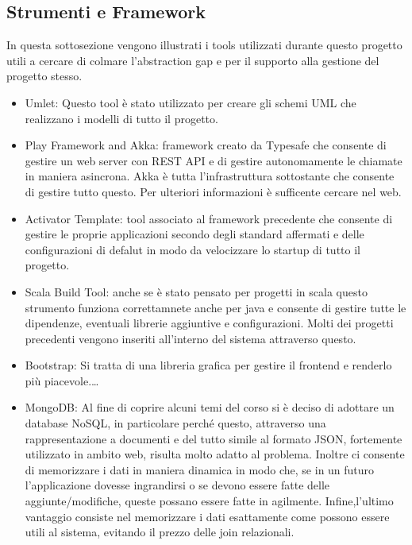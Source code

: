 \subsection{Strumenti e Framework}

In questa sottosezione vengono illustrati i tools utilizzati durante questo progetto utili a cercare di colmare l'abstraction gap e per il supporto alla gestione del progetto stesso.

\begin{itemize}
 \item {Umlet:} Questo tool \`e stato utilizzato per creare gli schemi UML che realizzano i modelli di tutto il progetto.\cite{Umlet}
 \item {Play Framework and Akka:} framework creato da Typesafe che consente di gestire un web server con REST API e di gestire autonomamente le chiamate in maniera asincrona. Akka \`e tutta l'infrastruttura sottostante che consente di gestire tutto questo. Per ulteriori informazioni \`e sufficente cercare nel web.\cite{Akka,PlayFramework}
 \item {Activator Template:} tool associato al framework precedente che consente di gestire le proprie applicazioni secondo degli standard affermati e delle configurazioni di defalut in modo da velocizzare lo startup di tutto il progetto.\cite{Activator&SBT}
 \item {Scala Build Tool:} anche se \`e stato pensato per progetti in scala questo strumento funziona correttamnete anche per java e consente di gestire tutte le dipendenze, eventuali librerie aggiuntive e configurazioni. Molti dei progetti precedenti vengono inseriti all'interno del sistema attraverso questo.\cite{Activator&SBT}
\item {Bootstrap:} Si tratta di una libreria grafica per gestire il frontend e renderlo pi\`u piacevole.\ldots
 \item {MongoDB:} Al fine di coprire alcuni temi del corso si \`e deciso di adottare un database NoSQL, in particolare perch\'e questo, attraverso una rappresentazione a documenti e del tutto simile al formato JSON, fortemente utilizzato in ambito web, risulta molto adatto al problema. Inoltre ci consente di memorizzare i dati in maniera dinamica in modo che, se in un futuro l'applicazione dovesse ingrandirsi o se devono essere fatte delle aggiunte/modifiche, queste possano essere fatte in agilmente. Infine,l'ultimo vantaggio consiste nel memorizzare i dati esattamente come possono essere utili al sistema, evitando il prezzo delle join relazionali. \cite{MongoDB}

\end{itemize}
